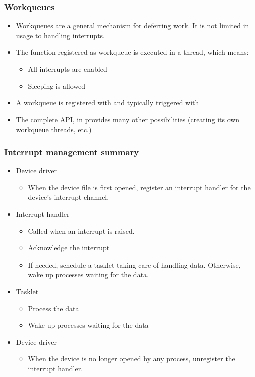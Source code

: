\begin{frame}
  \frametitle{Workqueues}
  \begin{itemize}
  \item Workqueues are a general mechanism for deferring work. It is
    not limited in usage to handling interrupts.
  \item The function registered as workqueue is executed in a thread,
    which means:
    \begin{itemize}
    \item All interrupts are enabled
    \item Sleeping is allowed
    \end{itemize}
  \item A workqueue is registered with  and typically
    triggered with 
  \item The complete API, in  provides
    many other possibilities (creating its own workqueue threads,
    etc.)
  \end{itemize}
\end{frame}

\begin{frame}
  \frametitle{Interrupt management summary}
  \begin{itemize}
  \item Device driver
    \begin{itemize}
    \item When the device file is first opened, register an interrupt
      handler for the device's interrupt channel.
    \end{itemize}
  \item Interrupt handler
    \begin{itemize}
    \item Called when an interrupt is raised.
    \item Acknowledge the interrupt
    \item If needed, schedule a tasklet taking care of handling
      data. Otherwise, wake up processes waiting for the data.
    \end{itemize}
  \item Tasklet
    \begin{itemize}
    \item Process the data
    \item Wake up processes waiting for the data
    \end{itemize}
  \item Device driver
    \begin{itemize}
    \item When the device is no longer opened by any process,
      unregister the interrupt handler.
    \end{itemize}
  \end{itemize}
\end{frame}
